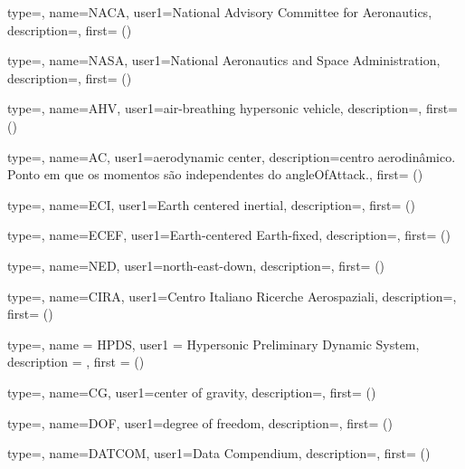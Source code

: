 {type=\acronymtype,
    name={NACA},
    user1={National Advisory Committee for Aeronautics},
    description={},
    first={ ()}
}

{type=\acronymtype,
    name={NASA},
    user1={National Aeronautics and Space Administration},
    description={},
    first={ ()}
}


{type=\acronymtype,
    name={AHV},
    user1={air-breathing hypersonic vehicle},
    description={},
    first={ ()}
}

{type=\acronymtype,
    name={AC},
    user1={aerodynamic center},
    description={centro aerodinâmico. Ponto em que os momentos são independentes do \gls{angleOfAttack}.},
    first={ ()}
}

{type=\acronymtype,
    name={ECI},
    user1={Earth centered inertial},
    description={},
    first={ ()}
}

{type=\acronymtype,
    name={ECEF},
    user1={Earth-centered Earth-fixed},
    description={},
    first={ ()}
}

{type=\acronymtype,
    name={NED},
    user1={north-east-down},
    description={},
    first={ ()}
}

{type=\acronymtype,
    name={CIRA},
    user1={Centro Italiano Ricerche Aerospaziali},
    description={},
    first={ ()}
}

{type=\acronymtype,
    name = {HPDS},
    user1 = {Hypersonic Preliminary Dynamic System},
    description = {},
    first = { ()}
}

{type=\acronymtype,
    name={CG},
    user1={center of gravity},
    description={},
    first={ ()}
}

{type=\acronymtype,
    name={DOF},
    user1={degree of freedom},
    description={},
    first={ ()}
}

{type=\acronymtype,
    name={DATCOM},
    user1={Data Compendium},
    description={},
    first={ ()}
}